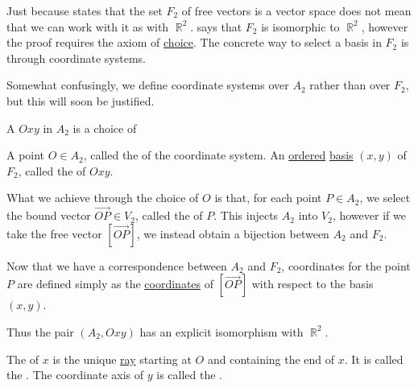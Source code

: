 \begin{definition}\label{def:euclidean_plane_coordinate_system}
  Just because  states that the set \( F_2 \) of free vectors is a vector space does not mean that we can work with it as with \( \BbbR^2 \).  says that \( F_2 \) is isomorphic to \( \BbbR^2 \), however the proof requires the axiom of \hyperref[def:set_zfc/A9]{choice}. The concrete way to select a basis in \( F_2 \) is through coordinate systems.

  Somewhat confusingly, we define coordinate systems over \( A_2 \) rather than over \( F_2 \), but this will soon be justified.

  A  \( Oxy \) in \( A_2 \) is a choice of
  \begin{defenum}
     A point \( O \in A_2 \), called the  of the coordinate system.
     An \hyperref[def:poset]{ordered} \hyperref[def:left_module_hamel_basis]{basis} \( (x, y) \) of \( F_2 \), called the  of \( Oxy \).
  \end{defenum}

  What we achieve through the choice of \( O \) is that, for each point \( P \in A_2 \), we select the bound vector \( \overrightarrow{OP} \in V_2 \), called the  of \( P \). This injects \( A_2 \) into \( V_2 \), however if we take the free vector \( [\overrightarrow{OP}] \), we instead obtain a bijection between \( A_2 \) and \( F_2 \).

  Now that we have a correspondence between \( A_2 \) and \( F_2 \), coordinates for the point \( P \) are defined simply as the \hyperref[def:left_module_basis_projection]{coordinates} of \( [\overrightarrow{OP}] \) with respect to the basis \( (x, y) \).

  Thus the pair \( (A_2, Oxy) \) has an explicit isomorphism with \( \BbbR^2 \).

  The  of \( x \) is the unique \hyperref[def:affine_plane/ray]{ray} starting at \( O \) and containing the end of \( x \). It is called the . The coordinate axis of \( y \) is called the .
\end{definition}

